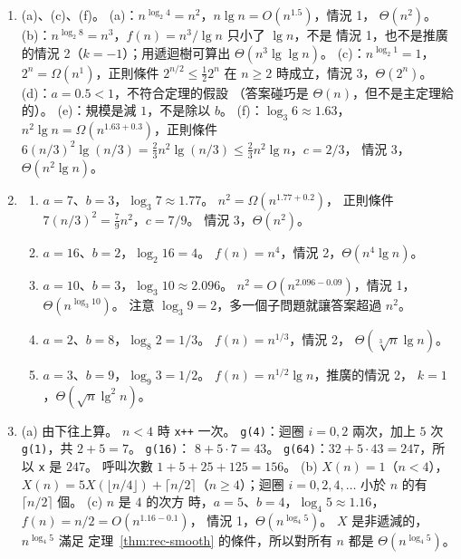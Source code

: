 \begin{enumerate}
\item (a)、(c)、(f)。 (a)：$n^{\log_2 4} = n^2$，$n \lg n = O(n^{1.5})$，情況 1，
$\Theta(n^2)$。 (b)：$n^{\log_2 8} = n^3$，$f(n) = n^3 / \lg n$ 只小了 $\lg n$，不是
情況 1，也不是推廣的情況 2（$k = -1$）；用遞迴樹可算出 $\Theta(n^3 \lg \lg n)$。
(c)：$n^{\log_2 1} = 1$，$2^n = \Omega(n^{1})$，正則條件 $2^{n/2} \le \frac{1}{2} 2^n$
在 $n \ge 2$ 時成立，情況 3，$\Theta(2^n)$。 (d)：$a = 0.5 < 1$，不符合定理的假設
（答案碰巧是 $\Theta(n)$，但不是主定理給的）。 (e)：規模是減 $1$，不是除以 $b$。
(f)：$\log_3 6 \approx 1.63$，$n^2 \lg n = \Omega(n^{1.63 + 0.3})$，正則條件
$6 (n/3)^2 \lg (n/3) = \frac{2}{3} n^2 \lg(n/3) \le \frac{2}{3} n^2 \lg n$，$c = 2/3$，
情況 3，$\Theta(n^2 \lg n)$。

\item
\begin{enumerate}
\item $a = 7$、$b = 3$，$\log_3 7 \approx 1.77$。 $n^2 = \Omega(n^{1.77 + 0.2})$，
正則條件 $7(n/3)^2 = \frac{7}{9} n^2$，$c = 7/9$。 情況 3，$\Theta(n^2)$。
\item $a = 16$、$b = 2$，$\log_2 16 = 4$。 $f(n) = n^4$，情況 2，$\Theta(n^4 \lg n)$。
\item $a = 10$、$b = 3$，$\log_3 10 \approx 2.096$。 $n^2 = O(n^{2.096 - 0.09})$，情況
1，$\Theta(n^{\log_3 10})$。 注意 $\log_3 9 = 2$，多一個子問題就讓答案超過 $n^2$。
\item $a = 2$、$b = 8$，$\log_8 2 = 1/3$。 $f(n) = n^{1/3}$，情況 2，
$\Theta(\sqrt[3]{n} \lg n)$。
\item $a = 3$、$b = 9$，$\log_9 3 = 1/2$。 $f(n) = n^{1/2} \lg n$，推廣的情況 2，
$k = 1$，$\Theta(\sqrt{n} \lg^2 n)$。
\end{enumerate}

\item (a) 由下往上算。 $n < 4$ 時 \texttt{x++} 一次。 \texttt{g(4)}：迴圈
$i = 0, 2$ 兩次，加上 $5$ 次 \texttt{g(1)}，共 $2 + 5 = 7$。 \texttt{g(16)}：
$8 + 5 \cdot 7 = 43$。 \texttt{g(64)}：$32 + 5 \cdot 43 = 247$，所以 \texttt{x} 是
$247$。 呼叫次數 $1 + 5 + 25 + 125 = 156$。 (b) $X(n) = 1$（$n < 4$），
$X(n) = 5X(\lfloor n/4 \rfloor) + \lceil n/2 \rceil$（$n \ge 4$）；迴圈
$i = 0, 2, 4, \ldots$ 小於 $n$ 的有 $\lceil n/2 \rceil$ 個。 (c) $n$ 是 $4$ 的次方
時，$a = 5$、$b = 4$，$\log_4 5 \approx 1.16$，$f(n) = n/2 = O(n^{1.16 - 0.1})$，
情況 1，$\Theta(n^{\log_4 5})$。 $X$ 是非遞減的，$n^{\log_4 5}$ 滿足
定理~\ref{thm:rec-smooth} 的條件，所以對所有 $n$ 都是 $\Theta(n^{\log_4 5})$。


\end{enumerate}

